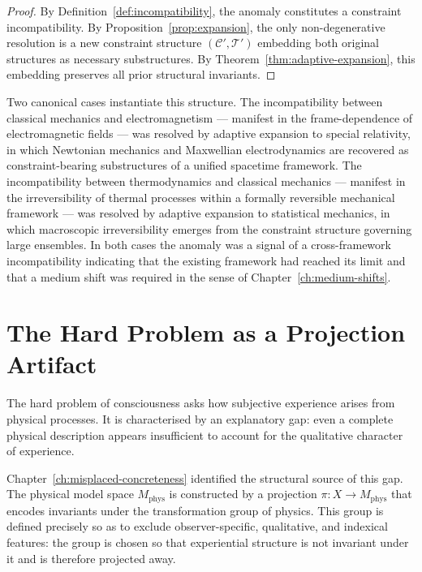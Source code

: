 \documentclass[11pt,openany]{book}
\begin{document}
\begin{proof}
By Definition~\ref{def:incompatibility}, the anomaly
constitutes a constraint incompatibility.  By
Proposition~\ref{prop:expansion}, the only non-degenerative
resolution is a new constraint structure $(\mathcal{C}',
\mathcal{T}')$ embedding both original structures as
necessary substructures.  By
Theorem~\ref{thm:adaptive-expansion}, this embedding
preserves all prior structural invariants.
\end{proof}

Two canonical cases instantiate this structure.  The
incompatibility between classical mechanics and
electromagnetism — manifest in the frame-dependence of
electromagnetic fields — was resolved by adaptive expansion
to special relativity, in which Newtonian mechanics and
Maxwellian electrodynamics are recovered as
constraint-bearing substructures of a unified spacetime
framework.  The incompatibility between thermodynamics and
classical mechanics — manifest in the irreversibility of
thermal processes within a formally reversible mechanical
framework — was resolved by adaptive expansion to
statistical mechanics, in which macroscopic irreversibility
emerges from the constraint structure governing large
ensembles.  In both cases the anomaly was a signal of a
cross-framework incompatibility indicating that the existing
framework had reached its limit and that a medium shift was
required in the sense of Chapter~\ref{ch:medium-shifts}.

\section{The Hard Problem as a Projection Artifact}
\label{sec:hard-problem}

The hard problem of consciousness asks how subjective
experience arises from physical processes.  It is
characterised by an explanatory gap: even a complete
physical description appears insufficient to account for
the qualitative character of experience.

Chapter~\ref{ch:misplaced-concreteness} identified the
structural source of this gap.  The physical model space
$M_{\mathrm{phys}}$ is constructed by a projection $\pi :
X \to M_{\mathrm{phys}}$ that encodes invariants under the
transformation group of physics.  This group is defined
precisely so as to exclude observer-specific, qualitative,
and indexical features: the group is chosen so that
experiential structure is not invariant under it and is
therefore projected away.
\end{document}
